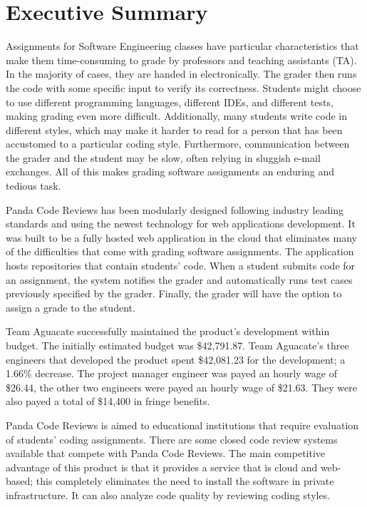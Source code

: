 \part*{Executive Summary}

Assignments for Software Engineering classes have particular characteristics
that make them time-consuming to grade by professors and teaching assistants
(TA). In the majority of cases, they are handed in electronically. The grader
then runs the code with some specific input to verify its correctness. Students
might choose to use different programming languages, different IDEs, and
different tests, making grading even more difficult. Additionally, many students
write code in different styles, which may make it harder to read for a person
that has been accustomed to a particular coding style. Furthermore,
communication between the grader and the student may be slow, often relying in
sluggish e-mail exchanges. All of this makes grading software assignments an
enduring and tedious task.

Panda Code Reviews has been modularly designed following industry leading
standards and using the newest technology for web applications development. It
was built to be a fully hosted web application in the cloud that
eliminates many of the difficulties that come with grading software assignments.
The application hosts repositories that contain students' code. When a
student submits code for an assignment, the system notifies the grader and
automatically runs test cases previously specified by the grader.
Finally, the grader will have the option to assign a
grade to the student.

Team Aguacate successfully maintained the product's development within budget. The initially estimated budget was \$42,791.87. Team Aguacate's three engineers that developed the product spent \$42,081.23 for the development; a 1.66\% decrease. The project manager engineer was payed an hourly wage of \$26.44, the other two engineers were payed an hourly wage of \$21.63. They were also payed a total of \$14,400 in fringe benefits.

Panda Code Reviews is aimed to educational institutions that require evaluation of students' coding assignments. There are some closed code review systems available that compete with Panda Code Reviews. The main competitive advantage of this product is that it provides a service that is cloud and web-based; this completely eliminates the need to install the software in private infrastructure. It can also analyze code quality by reviewing coding styles.